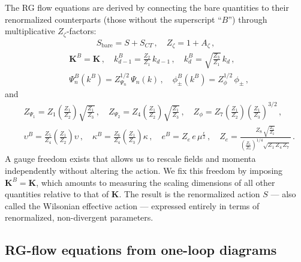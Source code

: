 The RG flow equations are derived by connecting the bare quantities to 
their renormalized counterparts (those without the superscript ``$B$'') 
through multiplicative $Z_\zeta$-factors:
\begin{align}
S_{\text{bare}} = S + S_{CT}\,, \quad Z_{\zeta} = 1 + A_{\zeta}\,,
\end{align}
\begin{align}
&\mathbf{K}^B = \mathbf{K}\,, \quad
k_{d-1}^B = \frac{Z_2}{Z_1}\,k_{d-1}\,, \quad
k^B_d = \sqrt{\frac{Z_3}{Z_1}}\,k_d\,, \nonumber \\
&\Psi_n^B(k^B) = Z_{\Psi_n}^{1/2}\,\Psi_n(k)\,, \quad
\phi_{\pm}^B(k^B) = Z_{\phi}^{1/2}\,\phi_{\pm}\,,
\end{align}
and
\begin{align}
& Z_{\Psi_1} = Z_1\left(\frac{Z_1}{Z_2}\right)
\sqrt{\frac{Z_1}{Z_3}}\,, \quad
Z_{\Psi_2} = Z_4\left(\frac{Z_1}{Z_2}\right)
\sqrt{\frac{Z_1}{Z_3}}\,, \quad
Z_{\phi} = Z_7\left(\frac{Z_1}{Z_2}\right)
\left(\frac{Z_1}{Z_3}\right)^{3/2}\,, \nonumber \\
& \upsilon^B = \frac{Z_5}{Z_4}\left(\frac{Z_1}{Z_2}\right)\upsilon\,, \quad
\kappa^B = \frac{Z_6}{Z_4}\left(\frac{Z_1}{Z_3}\right)\kappa\,, \quad
e^B = Z_e\,e\,\mu^{\frac{\epsilon}{2}}\,, \quad
Z_e = \frac{Z_8\,\sqrt{\frac{Z_1}{Z_2}}}
{\left(\frac{Z_1}{Z_3}\right)^{1/4}\sqrt{Z_1\,Z_4\,Z_7}}\,.
\end{align}
A gauge freedom exists that allows us to rescale fields and momenta 
independently without altering the action. We fix this freedom by 
imposing $\mathbf{K}^B = \mathbf{K}$, which amounts to measuring the 
scaling dimensions of all other quantities relative to that of 
$\mathbf{K}$. The result is the renormalized action $S$ --- also called 
the Wilsonian effective action --- expressed entirely in terms of 
renormalized, non-divergent parameters.

\subsection{RG-flow equations from one-loop diagrams}


